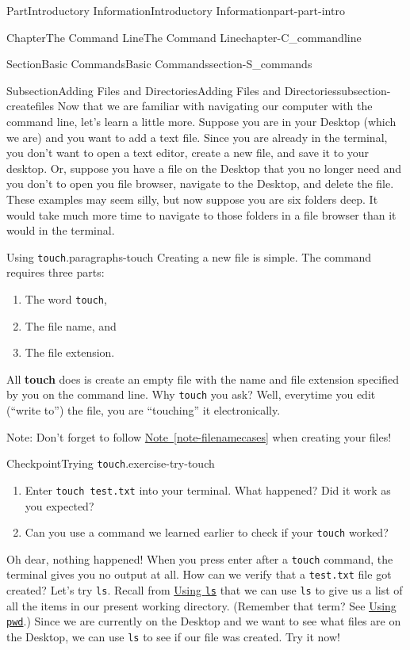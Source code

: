 \documentclass[oneside,10pt,]{book}
\newcommand{\xreffont}{\relax}
\newcommand{\mono}[1]{\texttt{#1}}
\newcommand{\terminology}[1]{\textbf{#1}}
\begin{document}
\begin{partptx}{Part}{Introductory Information}{}{Introductory Information}{}{}{part-part-intro}
\begin{chapterptx}{Chapter}{The Command Line}{}{The Command Line}{}{}{chapter-C_commandline}
\begin{sectionptx}{Section}{Basic Commands}{}{Basic Commands}{}{}{section-S_commands}
\begin{subsectionptx}{Subsection}{Adding Files and Directories}{}{Adding Files and Directories}{}{}{subsection-createfiles}
Now that we are familiar with navigating our computer with the command line, let's learn a little more. Suppose you are in your Desktop (which we are) and you want to add a text file. Since you are already in the terminal, you don't want to open a text editor, create a new file, and save it to your desktop. Or, suppose you have a file on the Desktop that you no longer need and you don't to open you file browser, navigate to the Desktop, and delete the file. These examples may seem silly, but now suppose you are six folders deep. It would take much more time to navigate to those folders in a file browser than it would in the terminal.%
\begin{paragraphs}{Using \mono{touch}.}{paragraphs-touch}%
\index{\mono{touch}}%
\index{command line!\mono{touch}}%
Creating a new file is simple. The command requires three parts:%
\begin{enumerate}
\item{}The word \mono{touch},%
\item{}The file name, and%
\item{}The file extension.%
\end{enumerate}
All \terminology{touch} does is create an empty file with the name and file extension specified by you on the command line. Why \mono{touch} you ask? Well, everytime you edit (``write to'') the file, you are ``touching'' it electronically.%
\par
Note: Don't forget to follow \hyperref[note-filenamecases]{Note~{\xreffont\ref{note-filenamecases}}} when creating your files!%
\begin{inlineexercise}{Checkpoint}{Trying \mono{touch}.}{exercise-try-touch}%
\begin{enumerate}[font=\bfseries,label=(\alph*),ref=\alph*]%
\item{}Enter \mono{touch test.txt} into your terminal. What happened? Did it work as you expected?%
\item{}Can you use a command we learned earlier to check if your \mono{touch} worked?%
\end{enumerate}%
\end{inlineexercise}%
Oh dear, nothing happened! When you press enter after a \mono{touch} command, the terminal gives you no output at all. How can we verify that a \mono{test.txt} file got created? Let's try \mono{ls}. Recall from \hyperlink{paragraphs-ls}{Using \mono{ls}} that we can use \mono{ls} to give us a list of all the items in our present working directory. (Remember that term? See \hyperlink{paragraphs-pwd}{Using \mono{pwd}}.) Since we are currently on the Desktop and we want to see what files are on the Desktop, we can use \mono{ls} to see if our file was created. Try it now!%

\end{paragraphs}
\end{subsectionptx}
\end{sectionptx}
\end{chapterptx}
\end{partptx}
\end{document}
